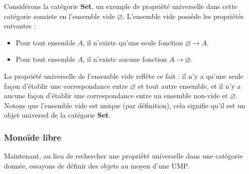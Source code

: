 \documentclass{article}
\begin{document}
\begin{example}{}
    Considérons la catégorie \textbf{Set}, un exemple de propriété universelle dans cette catégorie consiste en l'ensemble vide $\varnothing$. L'ensemble vide possède les propriétés suivantes :

    \begin{itemize}[label=\textbullet]
        \item Pour tout ensemble $A$, il n'existe qu'une seule fonction $\varnothing\to A$.
        \item Pour tout ensemble $A$, il n'existe aucune fonction $A\to\varnothing$.
    \end{itemize}

    \noindent
    La propriété universelle de l'ensemble vide reflète ce fait : il n'y a qu'une seule façon d'établir une correspondance entre $\varnothing$ et tout autre ensemble, et il n'y a aucune façon d'établir une correspondance entre un ensemble non-vide et $\varnothing$. Notons que l'ensemble vide est unique (par définition), cela signifie qu'il est un objet universel de la catégorie \textbf{Set}.
\end{example}

\subsubsection{Monoïde libre}
Maintenant, au lieu de rechercher une propriété universelle dans une catégorie donnée, essayons de définir des objets au moyen d'une UMP.
\end{document}

